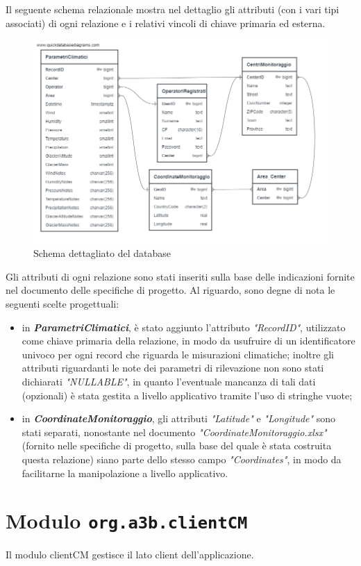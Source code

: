 Il seguente schema relazionale mostra nel dettaglio gli attributi (con i vari tipi associati) di ogni relazione e i relativi vincoli di chiave primaria ed esterna.

\begin{figure}[h]
	\centering
	\caption{Schema dettagliato del database}
	\label{fig:quickdbd-clima}
	\includegraphics[width=0.8\linewidth]{../../fig/img/tecnico/QuickDBD-clima}
\end{figure}

Gli attributi di ogni relazione sono stati inseriti sulla base delle indicazioni fornite nel documento delle specifiche di progetto. Al riguardo, sono degne di nota le seguenti scelte progettuali:
\begin{itemize}
	\item in \textit{\textbf{ParametriClimatici}}, è stato aggiunto l'attributo \textit{"RecordID"}, utilizzato come chiave primaria della relazione, in modo da usufruire di un identificatore univoco per ogni record che riguarda le misurazioni climatiche; inoltre gli attributi riguardanti le note dei parametri di rilevazione non sono stati dichiarati \textit{"NULLABLE"}, in quanto l'eventuale mancanza di tali dati (opzionali) è stata gestita a livello applicativo tramite l'uso di stringhe vuote;
	\item in \textit{\textbf{CoordinateMonitoraggio}}, gli attributi \textit{"Latitude"} e \textit{"Longitude"} sono stati separati, nonostante nel documento \textit{"CoordinateMonitoraggio.xlsx"} (fornito nelle specifiche di progetto, sulla base del quale è stata costruita questa relazione) siano parte dello stesso campo \textit{"Coordinates"}, in modo da facilitarne la manipolazione a livello applicativo.
\end{itemize}

\chapter{Modulo \texttt{org.a3b.clientCM}}
Il modulo clientCM gestisce il lato client dell'applicazione.
\label{ch:client}
